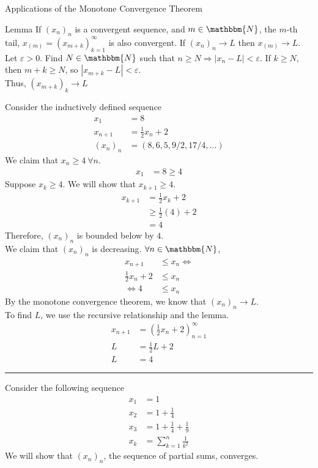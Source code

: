 \documentclass[10pt]{extarticle}
\newcommand{\N}{\mathbbm{N}}
\begin{document}
  \begin{problem}{Applications of the Monotone Convergence Theorem}
    \begin{problem}{Lemma}
      If $(x_n)_n$ is a convergent sequence, and $m\in\N$, the $m$-th tail, $x_{(m)} = (x_{m+k})_{k=1}^{\infty}$ is also convergent. If $(x_n)_n \rightarrow L$ then $x_{(m)}\rightarrow L$.
      \tcblower
      Let $\varepsilon > 0$. Find $N\in\N$ such that $n\geq N \Rightarrow |x_n - L| < \varepsilon$. If $k \geq N$, then $m + k \geq N$, so $|x_{m+k}-L| < \varepsilon$.\\

      Thus, $\left(x_{m+k}\right)_k \rightarrow L$
    \end{problem}
    Consider the inductively defined sequence
    \begin{align*}
      x_{1} &= 8\\
      x_{n+1} &= \frac{1}{2}x_n + 2\\
      (x_n)_n &= (8,6,5,9/2,17/4,\dots)
    \end{align*}
    We claim that $x_n \geq 4~\forall n$.
    \begin{align*}
      x_1 &= 8 \geq 4
    \end{align*}
    Suppose $x_k \geq 4$. We will show that $x_{k+1} \geq 4$.
    \begin{align*}
      x_{k + 1} &= \frac{1}{2}x_k + 2\\
                &\geq \frac{1}{2}(4) + 2\\
                &= 4
    \end{align*}
    Therefore, $(x_n)_n$ is bounded below by $4$.\\

    We claim that $(x_n)_n$ is decreasing. $\forall n\in\N$,
    \begin{align*}
      x_{n+1} &\leq x_n
      \Leftrightarrow \\
      \frac{1}{2}x_n + 2 &\leq x_n\\
      \Leftrightarrow
      4 &\leq x_n
    \end{align*}
    By the monotone convergence theorem, we know that $(x_n)_n\rightarrow L$.\\

    To find $L$, we use the recursive relationship and the lemma.
    \begin{align*}
      x_{n+1} &= \left(\frac{1}{2}x_n + 2\right)_{n=1}^{\infty}\\
      L &= \frac{1}{2}L + 2\\
      L &= 4
    \end{align*}
    \vspace{4pt}
    \rule{\textwidth}{0.4pt}
    \vspace{4pt}
    Consider the following sequence
    \begin{align*}
      x_1 &= 1\\
      x_2 &= 1 + \frac{1}{4}\\
      x_3 &= 1 + \frac{1}{4} + \frac{1}{9}\\
      x_{k} &= \sum_{k=1}^{n} \frac{1}{k^2}
    \end{align*}
    We will show that $(x_n)_n$, the sequence of partial sums, converges.\\


\end{problem}
\end{document}
